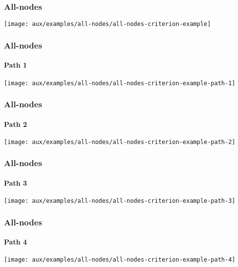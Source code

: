 \begin{frame}[c, hasprev=false, hasnext=true]
\label{example:all-nodes}
\frametitle{All-nodes}

\texttt{[image: aux/examples/all-nodes/all-nodes-criterion-example]}
\end{frame}


\begin{frame}[c,hasprev=true, hasnext=true]
\frametitle{All-nodes}
\framesubtitle{Path 1}

\texttt{[image: aux/examples/all-nodes/all-nodes-criterion-example-path-1]}
\end{frame}


\begin{frame}[c]
\frametitle{All-nodes}
\framesubtitle{Path 2}

\texttt{[image: aux/examples/all-nodes/all-nodes-criterion-example-path-2]}
\end{frame}


\begin{frame}[c]
\frametitle{All-nodes}
\framesubtitle{Path 3}

\texttt{[image: aux/examples/all-nodes/all-nodes-criterion-example-path-3]}
\end{frame}



\begin{frame}[c, hasprev=true, hasnext=false]
\frametitle{All-nodes}
\framesubtitle{Path 4}

\texttt{[image: aux/examples/all-nodes/all-nodes-criterion-example-path-4]}
\end{frame}